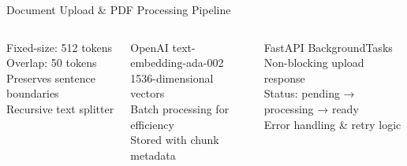 \documentclass[aspectratio=169,12pt]{beamer}
\begin{document}
\begin{frame}{Document Upload \& PDF Processing Pipeline}
\vspace{6pt}
\begin{columns}[T]
  \begin{tcolorbox}[mybox,title={Chunking Strategy}]
    \tiny
    Fixed-size: 512 tokens\\
    Overlap: 50 tokens\\
    Preserves sentence boundaries\\
    Recursive text splitter
  \end{tcolorbox}
  \begin{tcolorbox}[mybox,title={Embedding Model}]
    \tiny
    OpenAI text-embedding-ada-002\\
    1536-dimensional vectors\\
    Batch processing for efficiency\\
    Stored with chunk metadata
  \end{tcolorbox}
  \begin{tcolorbox}[mybox,title={Background Processing}]
    \tiny
    FastAPI BackgroundTasks\\
    Non-blocking upload response\\
    Status: pending → processing → ready\\
    Error handling \& retry logic
  \end{tcolorbox}
\end{columns}
\end{frame}
\end{document}
